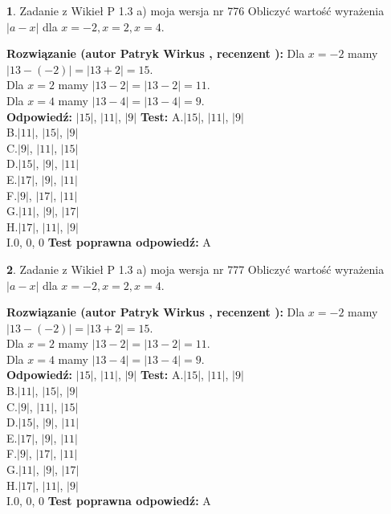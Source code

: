 \documentclass[12pt, a4paper]{article}
\theoremstyle{definition} %
\newtheorem{zad}{}
\newcommand{\zadStart}[1]{\begin{zad}#1\newline}
\newcommand{\zadStop}{\end{zad}}
\newcommand{\rozwStart}[2]{\noindent \textbf{Rozwiązanie (autor #1 , recenzent #2): }\newline}
\newcommand{\rozwStop}{\newline}
\newcommand{\odpStart}{\noindent \textbf{Odpowiedź:}\newline}
\newcommand{\odpStop}{\newline}
\newcommand{\testStart}{\noindent \textbf{Test:}\newline}
\newcommand{\testStop}{\newline}
\newcommand{\kluczStart}{\noindent \textbf{Test poprawna odpowiedź:}\newline}
\newcommand{\kluczStop}{\newline}
\begin{document}
\zadStart{Zadanie z Wikieł P 1.3 a) moja wersja nr 776}
Obliczyć wartość wyrażenia $|a - x|$ dla $x=-2,x=2,x=4$.
\zadStop
\rozwStart{Patryk Wirkus}{}
Dla $x = -2$ mamy $|13 - (-2)| = |13 + 2| = 15$.\\
Dla $x = 2$ mamy $|13 - 2| = |13 - 2| = 11$.\\
Dla $x = 4$ mamy $|13 - 4| = |13 - 4| = 9$.\\
\rozwStop
\odpStart
$|15|$, $|11|$, $|9|$
\odpStop
\testStart
A.$|15|$, $|11|$, $|9|$\\
B.$|11|$, $|15|$, $|9|$\\
C.$|9|$, $|11|$, $|15|$\\
D.$|15|$, $|9|$, $|11|$\\
E.$|17|$, $|9|$, $|11|$\\
F.$|9|$, $|17|$, $|11|$\\
G.$|11|$, $|9|$, $|17|$\\
H.$|17|$, $|11|$, $|9|$\\
I.$0$, $0$, $0$
\testStop
\kluczStart
A
\kluczStop



\zadStart{Zadanie z Wikieł P 1.3 a) moja wersja nr 777}
Obliczyć wartość wyrażenia $|a - x|$ dla $x=-2,x=2,x=4$.
\zadStop
\rozwStart{Patryk Wirkus}{}
Dla $x = -2$ mamy $|13 - (-2)| = |13 + 2| = 15$.\\
Dla $x = 2$ mamy $|13 - 2| = |13 - 2| = 11$.\\
Dla $x = 4$ mamy $|13 - 4| = |13 - 4| = 9$.\\
\rozwStop
\odpStart
$|15|$, $|11|$, $|9|$
\odpStop
\testStart
A.$|15|$, $|11|$, $|9|$\\
B.$|11|$, $|15|$, $|9|$\\
C.$|9|$, $|11|$, $|15|$\\
D.$|15|$, $|9|$, $|11|$\\
E.$|17|$, $|9|$, $|11|$\\
F.$|9|$, $|17|$, $|11|$\\
G.$|11|$, $|9|$, $|17|$\\
H.$|17|$, $|11|$, $|9|$\\
I.$0$, $0$, $0$
\testStop
\kluczStart
A
\kluczStop
\end{document}
